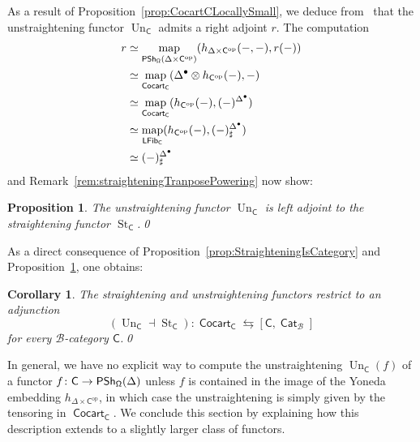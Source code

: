 \documentclass[reqno]{amsart}
\numberwithin{equation}{subsection}
\theoremstyle{plain}
\newtheorem{proposition}[equation]{Proposition}
\newtheorem{corollary}[equation]{Corollary}
\theoremstyle{definition}
\let\scr=\mathcal
\def\BB{\scr B}
\DeclareMathOperator{\IPSh}{\mathsf{PSh}}
\DeclareMathOperator{\ICat}{\mathsf{Cat}}
\DeclareMathOperator{\ICocart}{\mathsf{Cocart}}
\DeclareMathOperator{\ILFib}{\mathsf{LFib}}
\DeclareMathOperator{\Map}{map}
\DeclareMathOperator{\St}{St}
\DeclareMathOperator{\Un}{Un}
\newcommand{\op}{\mathrm{op}}
\newcommand{\map}[1]{\Map_{#1}}
\newcommand{\I}[1]{\mathsf{#1}}
\newcommand{\iFun}[2]{{[#1,#2]}}
\begin{document}
As a result of Proposition~\ref{prop:CocartCLocallySmall}, we deduce from~\cite[Remark~7.1.4]{Martini2021a} that the unstraightening functor $\Un_{\I{C}}$ admits a right adjoint $r$. The computation
\begin{align*}
r &\simeq\map{\IPSh_{\Univ}(\Delta\times\I{C}^{\op})}(h_{\Delta\times\I{C}^{\op}}(-,-), r(-))\\
&\simeq \map{\ICocart_{\I{C}}}(\Delta^{\bullet}\otimes h_{\I{C}^{\op}}(-), -)\\
&\simeq\map{\ICocart_{\I{C}}}(h_{\I{C}^{\op}}(-), (-)^{\Delta^\bullet})\\
&\simeq\map{\ILFib_{\I{C}}}(h_{\I{C}^{\op}}(-), (-)^{\Delta^{\bullet}}_\sharp)\\
&\simeq (-)^{\Delta^\bullet}_\sharp
\end{align*}
and Remark~\ref{rem:straighteningTranposePowering} now show:
\begin{proposition}
	\label{prop:adjunctionStUn}
	The unstraightening functor $\Un_{\I{C}}$ is left adjoint to the straightening functor $\St_{\I{C}}$.\qed
\end{proposition}
As a direct consequence of Proposition~\ref{prop:StraighteningIsCategory} and Proposition~\ref{prop:adjunctionStUn}, one obtains:
\begin{corollary}
	\label{cor:straighteningUnstraigheningAdjunction}
	The straightening and unstraightening functors restrict to an adjunction
	\begin{equation*}
	(\Un_{\I{C}}\dashv \St_{\I{C}})\colon \ICocart_{\I{C}}\leftrightarrows\iFun{\I{C}}{\ICat_{\BB}}
	\end{equation*}
	for every $\BB$-category $\I{C}$.\qed
\end{corollary}

In general, we have no explicit way to compute the unstraightening $\Un_{\I{C}}(f)$ of a functor $f\colon\I{C}\to\IPSh_{\Univ}(\Delta)$ unless $f$ is contained in the image of the Yoneda embedding $h_{\Delta\times\I{C}^{\op}}$, in which case the unstraightening is simply given by the tensoring in $\ICocart_{\I{C}}$. We conclude this section by explaining how this description extends to a slightly larger class of functors.
\end{document}
